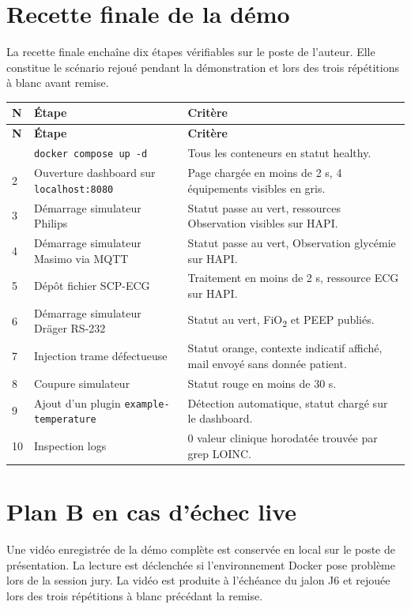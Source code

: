 \section{Recette finale de la démo}
\label{sec:recette-demo}

La recette finale enchaîne dix étapes vérifiables sur le poste de l'auteur. Elle constitue le scénario rejoué pendant la démonstration et lors des trois répétitions à blanc avant remise.

\bridgezebra
\begin{longtable}{p{0.8cm}p{6cm}p{7.5cm}}
  \toprule
  \rowcolor{bridgeblue!90}
  {\color{white}\bfseries N} & {\color{white}\bfseries Étape} & {\color{white}\bfseries Critère} \\
  \midrule
  \endfirsthead
  \toprule
  \rowcolor{bridgeblue!90}
  {\color{white}\bfseries N} & {\color{white}\bfseries Étape} & {\color{white}\bfseries Critère} \\
  \midrule
  \endhead
  \bottomrule
  \endfoot
  1  & \texttt{docker compose up -d}                              & Tous les conteneurs en statut healthy. \\
  2  & Ouverture dashboard sur \texttt{localhost:8080}            & Page chargée en moins de 2 s, 4 équipements visibles en gris. \\
  3  & Démarrage simulateur Philips                               & Statut passe au vert, ressources Observation visibles sur HAPI. \\
  4  & Démarrage simulateur Masimo via MQTT                       & Statut passe au vert, Observation glycémie sur HAPI. \\
  5  & Dépôt fichier SCP-ECG                                      & Traitement en moins de 2 s, ressource ECG sur HAPI. \\
  6  & Démarrage simulateur Dräger RS-232                         & Statut au vert, FiO\textsubscript{2} et PEEP publiés. \\
  7  & Injection trame défectueuse                                & Statut orange, contexte indicatif affiché, mail envoyé sans donnée patient. \\
  8  & Coupure simulateur                                         & Statut rouge en moins de 30 s. \\
  9  & Ajout d'un plugin \texttt{example-temperature}             & Détection automatique, statut chargé sur le dashboard. \\
  10 & Inspection logs                                            & 0 valeur clinique horodatée trouvée par grep LOINC. \\
\end{longtable}

\section{Plan B en cas d'échec live}
\label{sec:plan-b}

Une vidéo enregistrée de la démo complète est conservée en local sur le poste de présentation. La lecture est déclenchée si l'environnement Docker pose problème lors de la session jury. La vidéo est produite à l'échéance du jalon J6 et rejouée lors des trois répétitions à blanc précédant la remise.
